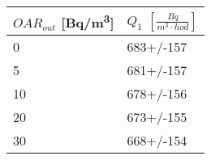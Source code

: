 \begin{tabular}{ll}
\toprule
$OAR_{out}$ [\si{Bq/m^3}] & $Q_1$ $\left[\si{\frac{Bq}{m^3\cdot hod}}\right]$ \\
\midrule
0  &                                         683+/-157 \\
5  &                                         681+/-157 \\
10 &                                         678+/-156 \\
20 &                                         673+/-155 \\
30 &                                         668+/-154 \\
\bottomrule
\end{tabular}
